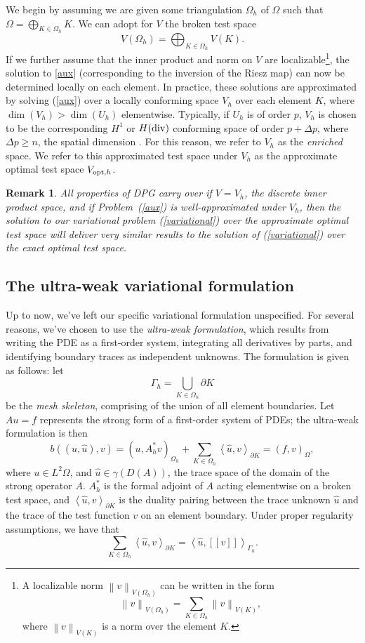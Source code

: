 \documentclass[11pt,onecolumn]{scrartcl}
\newcommand{\nor}[1]{\left\| #1 \right\|}
\newcommand{\LRp}[1]{\left( #1 \right)}
\newcommand{\LRs}[1]{\left[ #1 \right]}
\newcommand{\LRa}[1]{\left\langle #1 \right\rangle}
\newcommand{\jump}[1] {\ensuremath{\LRs{\!\left[#1\right]\!}}}
\newcommand{\uh}{\widehat{u}}
\newcommand{\Gh}{\Gamma_h}
\newcommand{\Oh}{\Omega_h}
\newcommand{\del}{\Delta}
\newtheorem{remark}{Remark}
\begin{document}
We begin by assuming we are given some triangulation $\Omega_h$ of $\Omega$ such that $\Omega = \bigoplus_{K\in \Omega_h}K$.  We can adopt for $V$ the broken test space
\[
V(\Oh) = \bigoplus_{K\in \Omega_h}V(K).
\]
If we further assume that the inner product and norm on $V$ are localizable\footnote{A localizable norm $\nor{v}_{V(\Oh)}$ can be written in the form 
$$\nor{v}_{V(\Oh)} = \sum_{K\in\Oh} \nor{v}_{V(K)},$$ where $\nor{v}_{V(K)}$ is a norm over the element $K$.}, the solution to \eqref{aux} (corresponding to the inversion of the Riesz map) can now be determined locally on each element.  In practice, these solutions are approximated by solving (\ref{aux}) over a locally conforming space $V_h$ over each element $K$, where $\dim(V_h) > \dim(U_h)$ elementwise.  Typically, if $U_h$ is of order $p$, $V_h$ is chosen to be the corresponding $H^1$ or $H({\rm div})$ conforming space of order $p + \del p$, where $\del p \geq n$, the spatial dimension \cite{practicalDPG}.  For this reason, we refer to $V_h$ as the \textit{enriched} space.  We refer to this approximated test space under $V_h$ as the approximate optimal test space $V_{{\rm opt},h}$.  
\begin{remark}
All properties of DPG carry over if $V=V_h$, the discrete inner product space, and if Problem~(\ref{aux}) is well-approximated under $V_h$, then the solution to our variational problem (\ref{variational}) over the approximate optimal test space will deliver very similar results to the solution of (\ref{variational}) over the exact optimal test space.  
\end{remark}

\subsection{The ultra-weak variational formulation}

Up to now, we've left our specific variational formulation unspecified.  For several reasons, we've chosen to use the \textit{ultra-weak formulation}, which results from writing the PDE as a first-order system, integrating all derivatives by parts, and identifying boundary traces as independent unknowns.  The formulation is given as follows: let $$\Gh = \bigcup_{K\in \Oh} \partial K$$ be the \textit{mesh skeleton}, comprising of the union of all element boundaries.  Let $Au=f$ represents the strong form of a first-order system of PDEs; the ultra-weak formulation is then
\begin{equation}
\label{variationalProblem}
b\LRp{\LRp{u,\uh},v} = \LRp{u,A_h^*v}_{\Oh} + \sum_{K \in \Oh} \LRa{\uh,v}_{\partial K} = \LRp{f,v}_{\Omega},
\end{equation}
where $u \in L^2{\Omega}$, and $\uh \in \gamma(D(A))$, the trace space of the domain of the strong operator $A$.  $A_h^*$ is the formal adjoint of $A$ acting elementwise on a broken test space, and $\LRa{\uh,v}_{\partial K}$ is the duality pairing between the trace unknown $\uh$ and the trace of the test function $v$ on an element boundary.  Under proper regularity assumptions, we have that
$$\sum_{K \in \Oh} \LRa{\uh,v}_{\partial K} = \LRa{\uh,\jump{v}}_{\Gh}.$$  
\end{document}

